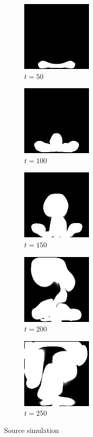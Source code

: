 \documentclass[a4paper,12pt,twoside]{report}
\begin{document}
\begin{figure}
\centering
\begin{subfigure}{0.18\textwidth}
  \centering
  \includegraphics[scale=0.56]{buoyancy_test/dens_000050_src.png}
  \caption{$t=50$}
\end{subfigure}
\begin{subfigure}{0.18\textwidth}
  \centering
  \includegraphics[scale=0.56]{buoyancy_test/dens_000100_src.png}
  \caption{$t=100$}
\end{subfigure}
\begin{subfigure}{0.18\textwidth}
  \centering
  \includegraphics[scale=0.56]{buoyancy_test/dens_000150_src.png}
  \caption{$t=150$}
\end{subfigure}
\begin{subfigure}{0.18\textwidth}
  \centering
  \includegraphics[scale=0.56]{buoyancy_test/dens_000200_src.png}
  \caption{$t=200$}
\end{subfigure}
\begin{subfigure}{0.18\textwidth}
  \centering
  \includegraphics[scale=0.56]{buoyancy_test/dens_000249_src.png}
  \caption{$t=250$}
\end{subfigure}
\caption{Source simulation}
\end{figure}
\end{document}
